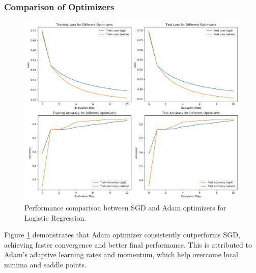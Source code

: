 \documentclass[journal, a4paper]{IEEEtran}
\begin{document}
\subsubsection{Comparison of Optimizers}
\begin{figure}[htbp]
\centering
\includegraphics[width=\linewidth]{logistic_regression_optimizers.png}
\caption{Performance comparison between SGD and Adam optimizers for Logistic Regression.}
\label{fig:lr_opt}
\end{figure}

Figure \ref{fig:lr_opt} demonstrates that Adam optimizer consistently outperforms SGD, achieving faster convergence and better final performance. This is attributed to Adam's adaptive learning rates and momentum, which help overcome local minima and saddle points.
\end{document}
